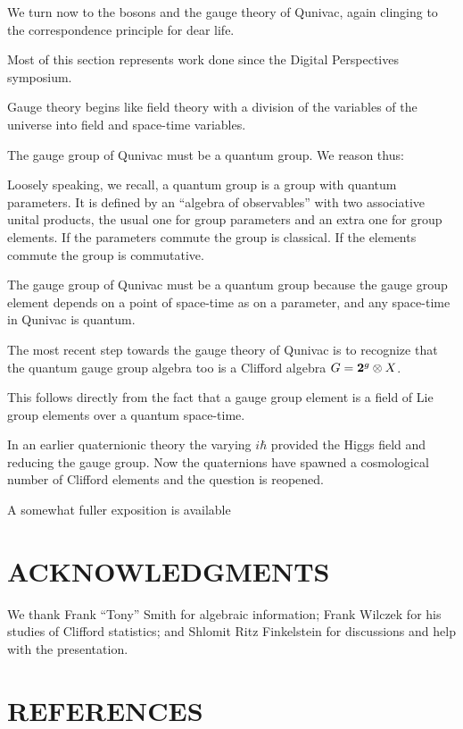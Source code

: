 \documentclass[a4paper,11pt]{article}
\begin{document}
We turn now to the bosons
and 
the gauge theory of Qunivac,
again clinging to the correspondence principle
for dear life.

Most of this section represents work
done since the Digital Perspectives symposium.

Gauge theory begins like field theory
with a division of the variables of the universe
into field and space-time variables.

The gauge group of Qunivac must be a quantum group.
We reason thus:

Loosely speaking, we recall,
a quantum group 
is a group with quantum parameters.
It is defined by an ``algebra of observables''
with two associative unital products,
the usual one for  group 
parameters
 \cite{FINKELSTEIN1996}
and an extra one for group elements.
If the parameters commute the group is classical.
If the elements commute
the group is commutative.

The gauge group of Qunivac must be a quantum group
because
 the gauge group element
depends on a point of space-time as on a parameter,
and any space-time in Qunivac is quantum.

The most recent step towards
the gauge theory of Qunivac
is to recognize that the quantum gauge group algebra
too is a Clifford algebra $G={\bf 2}^g\otimes X$.

This follows directly from the fact
that a gauge group element
is a field of Lie group elements
over a quantum space-time.

In an earlier quaternionic theory
the varying  $i\hbar$
provided the Higgs field
and reducing the gauge group.
Now  the quaternions
have spawned 
a cosmological number of Clifford elements
and the question is reopened.

A somewhat fuller exposition
is available \cite{BAUGH02}

\section{ACKNOWLEDGMENTS}
We thank 
Frank ``Tony'' Smith for algebraic information;
Frank Wilczek for his  studies of Clifford statistics;
and Shlomit Ritz Finkelstein
for discussions and help with the presentation.


\section{REFERENCES}
\end{document}
